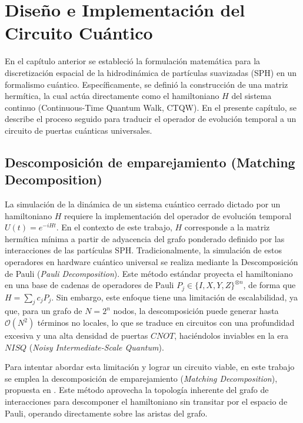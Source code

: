 \chapter{Diseño e Implementación del Circuito Cuántico}
\label{cap:implementacion_circuito}

En el capítulo anterior se estableció la formulación matemática para la discretización espacial de la hidrodinámica de partículas suavizadas (SPH) en un formalismo cuántico. Específicamente, se definió la construcción de una matriz hermítica, la cual actúa directamente como el hamiltoniano $H$ del sistema continuo (Continuous-Time Quantum Walk, CTQW). En el presente capítulo, se describe el proceso seguido para traducir el operador de evolución temporal a un circuito de puertas cuánticas universales.

\section{Descomposición de emparejamiento (Matching Decomposition)}
\label{sec:matching_decomposition}

La simulación de la dinámica de un sistema cuántico cerrado dictado por un hamiltoniano $H$ requiere la implementación del operador de evolución temporal $U(t) = e^{-iHt}$. En el contexto de este trabajo, $H$ corresponde a la matriz hermítica mínima a partir de adyacencia del grafo ponderado definido por las interacciones de las partículas SPH. Tradicionalmente, la simulación de estos operadores en hardware cuántico universal se realiza mediante la Descomposición de Pauli (\emph{Pauli Decomposition}). Este método estándar proyecta el hamiltoniano en una base de cadenas de operadores de Pauli $P_j \in \{I, X, Y, Z\}^{\otimes n}$, de forma que $H = \sum_{j} c_j P_j$. Sin embargo, este enfoque tiene una limitación de escalabilidad, ya que, para un grafo de $N = 2^n$ nodos, la descomposición puede generar hasta $\mathcal{O}(N^2)$ términos no locales, lo que se traduce en circuitos con una profundidad excesiva y una alta densidad de puertas $CNOT$, haciéndolos inviables en la era $NISQ$ (\emph{Noisy Intermediate-Scale Quantum}).

Para intentar abordar esta limitación y lograr un circuito viable, en este trabajo se emplea la descomposición de emparejamiento (\textit{Matching Decomposition}), propuesta en \cite{matching2026}. Este método aprovecha la topología inherente del grafo de interacciones para descomponer el hamiltoniano sin transitar por el espacio de Pauli, operando directamente sobre las aristas del grafo.

